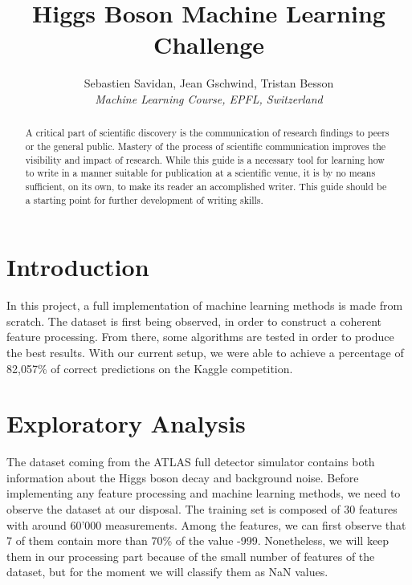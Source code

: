 \documentclass[10pt,conference,compsocconf]{IEEEtran}
\begin{document}
\title{Higgs Boson Machine Learning Challenge}

\author{
  Sebastien Savidan, Jean Gschwind, Tristan Besson\\
  \textit{Machine Learning Course, EPFL, Switzerland}
}

\maketitle

\begin{abstract}
  A critical part of scientific discovery is the
  communication of research findings to peers or the general public.
  Mastery of the process of scientific communication improves the
  visibility and impact of research. While this guide is a necessary
  tool for learning how to write in a manner suitable for publication
  at a scientific venue, it is by no means sufficient, on its own, to
  make its reader an accomplished writer. 
  This guide should be a starting point for further development of 
  writing skills.
\end{abstract}

\section{Introduction}

In this project, a full implementation of machine learning methods is made from scratch. The dataset is first being observed, in order to construct a coherent feature processing. From there, some algorithms are tested in order to produce the best results. With our current setup, we were able to achieve a percentage of 82,057\% of correct predictions on the Kaggle competition.

\section{Exploratory Analysis}

The dataset coming from the ATLAS full detector simulator contains both information about the Higgs boson decay and background noise. Before implementing any feature processing and machine learning methods, we need to observe the dataset at our disposal. The training set is composed of 30 features with around 60'000 measurements. Among the features, we can first observe that 7 of them contain more than 70\% of the value -999. Nonetheless, we will keep them in our processing part because of the small number of features of the dataset, but for the moment we will classify them as NaN values.
\end{document}
